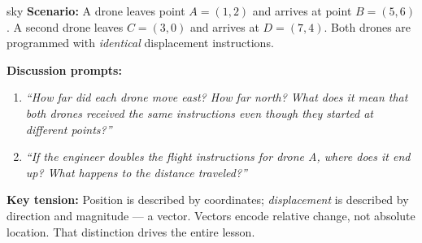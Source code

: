 \documentclass[10pt]{article}
\begin{document}
\vspace{0.08in}

\begin{skillbox}{sky}
\textbf{Scenario:} A drone leaves point $A=(1,2)$ and arrives at point $B=(5,6)$.
A second drone leaves $C=(3,0)$ and arrives at $D=(7,4)$. Both drones are programmed
with \emph{identical} displacement instructions.

\textbf{Discussion prompts:}
\begin{enumerate}[leftmargin=1.4em, itemsep=3pt]
  \item \textit{``How far did each drone move east? How far north? What does
    it mean that both drones received the same instructions even though they
    started at different points?''}
  \item \textit{``If the engineer doubles the flight instructions for drone A,
    where does it end up? What happens to the distance traveled?''}
\end{enumerate}

\textbf{Key tension:} Position is described by coordinates; \emph{displacement}
is described by direction and magnitude --- a vector. Vectors encode relative
change, not absolute location. That distinction drives the entire lesson.
\end{skillbox}

\vspace{0.08in}
\end{document}
